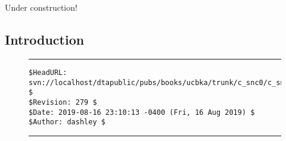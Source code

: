 
\chapter{\csnczerolongtitle{}}

\label{csnc0}

                     {Under construction!}

\section{Introduction}



\vfill
\noindent\begin{figure}[!b]
\noindent\rule[-0.25in]{\textwidth}{1pt}
\begin{tiny}
\begin{verbatim}
$HeadURL: svn://localhost/dtapublic/pubs/books/ucbka/trunk/c_snc0/c_snc0.tex $
$Revision: 279 $
$Date: 2019-08-16 23:10:13 -0400 (Fri, 16 Aug 2019) $
$Author: dashley $
\end{verbatim}
\end{tiny}
\noindent\rule[0.25in]{\textwidth}{1pt}
\end{figure}
%
